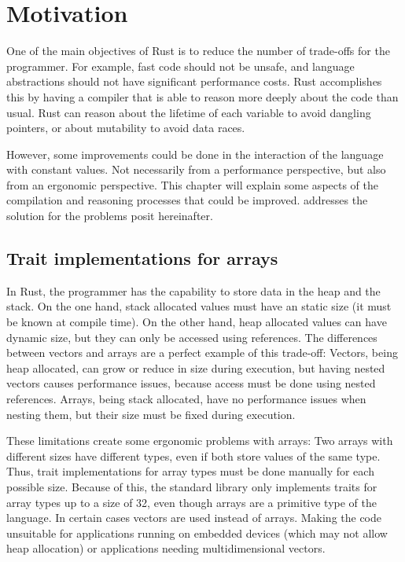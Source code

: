 \chapter{Motivation}
One of the main objectives of Rust is to reduce the number of trade-offs for
the programmer. For example, fast code should not be unsafe, and language
abstractions should not have significant performance costs. Rust accomplishes
this by having a compiler that is able to reason more deeply about the code
than usual. Rust can reason about the lifetime of each variable to avoid
dangling pointers, or about mutability to avoid data races. 

However, some improvements could be done in the interaction of the language
with constant values. Not necessarily from a performance perspective, but also
from an ergonomic perspective. This chapter will explain some aspects of the
compilation and reasoning processes that could be improved.
 addresses the solution for the problems
posit hereinafter.

\label{chap:motivation}
\section{Trait implementations for arrays}
In Rust, the programmer has the capability to store data in the heap and the
stack. On the one hand, stack allocated values must have an static size (it
must be known at compile time). On the other hand, heap allocated values can
have dynamic size, but they can only be accessed using references. The
differences between vectors and arrays are a perfect example of this trade-off:
Vectors, being heap allocated, can grow or reduce in size during execution, but
having nested vectors causes performance issues, because access must be done
using nested references. Arrays, being stack allocated, have no performance
issues when nesting them, but their size must be fixed during execution.

These limitations create some ergonomic problems with arrays: Two arrays with
different sizes have different types, even if both store values of the same
type. Thus, trait implementations for array types must be done manually for
each possible size. Because of this, the standard library only implements
traits for array types up to a size of 32, even though arrays are a primitive
type of the language. In certain cases vectors are used instead of arrays.
Making the code unsuitable for applications running on embedded devices (which
may not allow heap allocation) or applications needing multidimensional
vectors.

